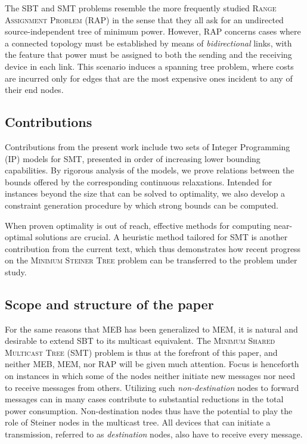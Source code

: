 The SBT and SMT problems resemble the more frequently studied \textsc{Range Assignment Problem} (RAP) 
in the sense that they all ask for an undirected source-independent tree of minimum power.
However, RAP concerns cases where a connected topology must be established by means of \emph{bidirectional} links,
with the feature that power must be assigned to both the sending and the receiving device in each link.
This scenario induces a spanning tree problem, where costs are incurred only for edges that are the most expensive ones incident to any of their end nodes.

\subsection{Contributions}

Contributions from the present work include two sets of Integer Programming (IP) models for SMT, presented in order of increasing lower bounding capabilities.
By rigorous analysis of the models, we prove relations between the bounds offered by the corresponding continuous relaxations.
Intended for instances beyond the size that can be solved to optimality, we also develop a constraint generation procedure by which strong bounds can be computed.

When proven optimality is out of reach, effective methods for computing near-optimal solutions are crucial.
A heuristic method tailored for SMT is another contribution from the current text,
which thus demonstrates how recent progress on the \textsc{Minimum Steiner Tree} problem can be transferred to the problem under study.

\subsection{Scope and structure of the paper}

For the same reasons that MEB has been generalized to MEM, it is natural and desirable to extend SBT to its multicast equivalent.
The \textsc{Minimum Shared Multicast Tree} (SMT) problem is thus at the forefront of this paper,
and neither MEB, MEM, nor RAP will be given much attention.
Focus is henceforth on instances in which some of the nodes neither initiate new messages nor need to receive messages from others.
Utilizing such \emph{non-destination} nodes to forward messages can in many cases contribute to substantial reductions in the total power consumption.
Non-destination nodes thus have the potential to play the role of Steiner nodes in the multicast tree.
All devices that can initiate a transmission, referred to as \emph{destination} nodes, also have to receive every message.

